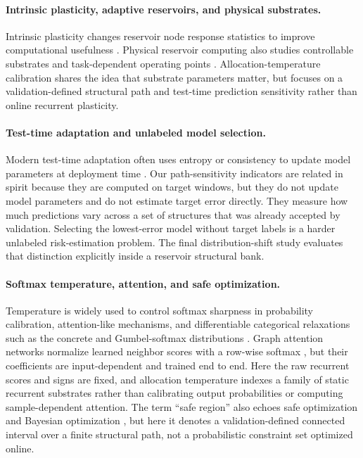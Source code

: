 \documentclass[preprint,12pt,authoryear]{elsarticle}
\begin{document}
\paragraph{Intrinsic plasticity, adaptive reservoirs, and physical substrates.}
Intrinsic plasticity changes reservoir node response statistics to improve computational usefulness \citep{schrauwen2008improving}. Physical reservoir computing also studies controllable substrates and task-dependent operating points \citep{appeltant2011information,tanaka2019recent,vandoorn2017model}. Allocation-temperature calibration shares the idea that substrate parameters matter, but focuses on a validation-defined structural path and test-time prediction sensitivity rather than online recurrent plasticity.

\paragraph{Test-time adaptation and unlabeled model selection.}
Modern test-time adaptation often uses entropy or consistency to update model parameters at deployment time \citep{wang2021tent,niu2022sentry}. Our path-sensitivity indicators are related in spirit because they are computed on target windows, but they do not update model parameters and do not estimate target error directly. They measure how much predictions vary across a set of structures that was already accepted by validation. Selecting the lowest-error model without target labels is a harder unlabeled risk-estimation problem. The final distribution-shift study evaluates that distinction explicitly inside a reservoir structural bank.

\paragraph{Softmax temperature, attention, and safe optimization.}
Temperature is widely used to control softmax sharpness in probability calibration, attention-like mechanisms, and differentiable categorical relaxations such as the concrete and Gumbel-softmax distributions \citep{guo2017calibration,maddison2017concrete,jang2017categorical}. Graph attention networks normalize learned neighbor scores with a row-wise softmax \citep{velickovic2018graph}, but their coefficients are input-dependent and trained end to end. Here the raw recurrent scores and signs are fixed, and allocation temperature indexes a family of static recurrent substrates rather than calibrating output probabilities or computing sample-dependent attention. The term ``safe region'' also echoes safe optimization and Bayesian optimization \citep{snoek2012practical,sui2015safe}, but here it denotes a validation-defined connected interval over a finite structural path, not a probabilistic constraint set optimized online.
\end{document}
